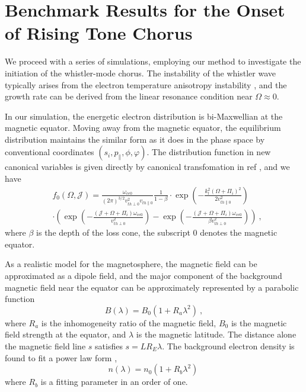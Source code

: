 \section{Benchmark Results for the Onset of Rising Tone Chorus}
\label{sec:code}
We proceed with a series of simulations, employing our method to investigate the initiation of the whistler-mode chorus. The instability of the whistler wave typically arises from the electron temperature anisotropy instability \cite{kennel1966a,kennel1966b}, and the growth rate can be derived from the linear resonance condition near $\Omega \approx 0$.

In our simulation, the energetic electron distribution is bi-Maxwellian at the magnetic equator. 
Moving away from the magnetic equator, the equilibrium distribution maintains the similar form as it does in the phase space by conventional coordinates $(s_i, p_\|, \phi, \varphi)$. The distribution function in new canonical variables is given directly by canonical transfomation in ref \cite{zheng2023a}, and we have 
\begin{equation}
    \begin{aligned}
        & f_{0}(\Omega, \mathcal{J}) =\frac{\omega_{c e 0}}{(2 \pi)^{3 / 2} v_{t h \perp 0}^2 v_{t h \| 0}} \frac{1}{1-\beta} \cdot \exp \left(-\frac{k_l^2(\Omega+\Pi_i)^2}{2 v_{t h \| 0}^2}\right) \\
        &\cdot\left(\exp \left(-\frac{(\mathcal{J}+\Omega+\Pi_i) \omega_{c e 0}}{v_{t h \perp 0}^2}\right)-\exp \left(-\frac{(\mathcal{J}+\Omega+\Pi_i) \omega_{c e 0}}{\beta v_{t h \perp 0}^2}\right)\right)~,
        \end{aligned}
\end{equation}
where $\beta$ is the depth of the loss cone, the subscript $0$ denotes the magnetic equator.

As a realistic model for the magnetosphere, the magnetic field can be approximated as a dipole field, and the major component of the background magnetic field near the equator can be approximately represented by a parabolic function \cite{tao_numerical_2014}
\begin{equation}
    B(\lambda) = B_0(1+ R_a \lambda ^2)~,
\end{equation}
where $R_a$ is the inhomogeneity ratio of the magnetic field, $B_0$ is the magnetic field strength at the equator, and $\lambda$ is the magnetic latitude. The distance alone the magnetic field line $s$ satisfies $s = L R_E \lambda$.
The background electron density is found to fit a power law form \cite{denton2004},
\begin{equation}
    n(\lambda) = n_0 (1+R_b \lambda^2)~
\end{equation}
where $R_b$ is a fitting parameter in an order of one.

